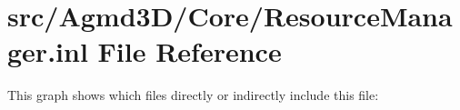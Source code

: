 \hypertarget{_resource_manager_8inl}{\section{src/\+Agmd3\+D/\+Core/\+Resource\+Manager.inl File Reference}
\label{_resource_manager_8inl}
}
This graph shows which files directly or indirectly include this file\+:
